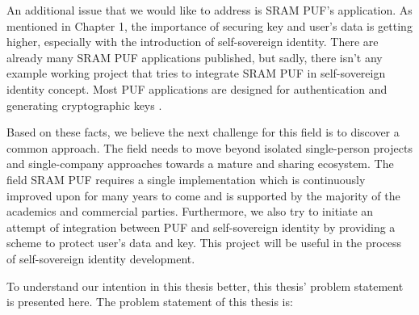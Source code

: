 An additional issue that we would like to address is SRAM PUF's application. As mentioned in Chapter 1, the importance of securing key and user's data is getting higher, especially with the introduction of self-sovereign identity. There are already many SRAM PUF applications published, but sadly, there isn't any example working project that tries to integrate SRAM PUF in self-sovereign identity concept. Most PUF applications are designed for authentication \cite{Tuyls2007} \cite{delvaux} \cite{Suh:2007:PUF:1278480.1278484} \cite{10.1007/978-3-642-04474-8_22} \cite{10.1007/978-3-642-10838-9_22} \cite{10.1007/978-3-319-29078-2_5}
and generating cryptographic keys \cite{Suh:2007:PUF:1278480.1278484} \cite{10.1007/978-3-642-33027-8_18}.

Based on these facts, we believe the next challenge for this field is to discover a common approach. The field needs to move beyond isolated single-person projects and single-company approaches towards a mature and sharing ecosystem. The field SRAM PUF requires a single implementation which is continuously improved upon for many years to come and is supported by the majority of the academics and commercial parties.
Furthermore, we also try to initiate an attempt of integration between PUF and self-sovereign identity by providing a scheme to protect user's data and key. This project will be useful in the process of self-sovereign identity development.

To understand our intention in this thesis better, this thesis' problem statement is presented here. The problem statement of this thesis is:

\begin{adjustwidth}{1cm}{1cm}
		\textit{\problemStatement}
\end{adjustwidth}

